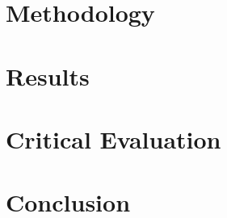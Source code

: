 \documentclass[a4paper, 12pt, hidelinks]{article}
\begin{document}
	\section{Methodology}
	
	\clearpage	
	\section{Results}
	\clearpage
	\section{Critical Evaluation}
	\clearpage
	\section{Conclusion}
	\clearpage
		
	\clearpage
	\printacronyms
	\printglossary[type=main]
	\clearpage
	\appendix
	\thispagestyle{empty}
\end{document}
